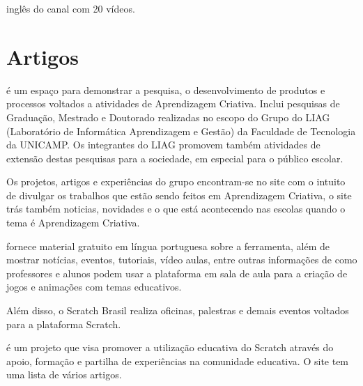 \documentclass[12pt,fleqn]{book} %
\begin{document}
\textcite{blank2018} inglês do canal com 20 vídeos.

\section{Artigos}

\textcite{liag2018} é um espaço para demonstrar a pesquisa, o desenvolvimento de produtos e processos voltados a atividades de Aprendizagem Criativa. Inclui pesquisas de Graduação, Mestrado e Doutorado realizadas no escopo do Grupo do LIAG (Laboratório de Informática Aprendizagem e Gestão) da Faculdade de Tecnologia da UNICAMP. Os integrantes do LIAG promovem também atividades de extensão destas pesquisas para a sociedade, em especial para o público escolar.

Os projetos, artigos e experiências do grupo encontram-se no site com o intuito de divulgar os trabalhos que estão sendo feitos em Aprendizagem Criativa, o site trás também noticias, novidades e o que está acontecendo nas escolas quando o tema é Aprendizagem Criativa.

\textcite{scratchbrasil2018} fornece material gratuito em língua portuguesa sobre a ferramenta, além de mostrar notícias, eventos, tutoriais, vídeo aulas, entre outras informações de como professores e alunos podem usar a plataforma em sala de aula para a criação de jogos e animações com temas educativos.

Além disso, o Scratch Brasil realiza oficinas, palestras e demais eventos voltados para a plataforma Scratch.

\textcite{eduscratch2018} é um projeto que visa promover a utilização educativa do Scratch através do apoio, formação e partilha de experiências na comunidade educativa. O site tem uma lista de vários artigos. 




\end{document}
